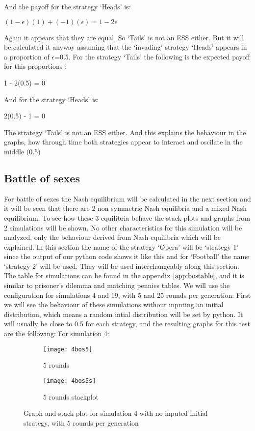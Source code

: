 And the payoff for the strategy `Heads' is:
\begin{center}
$(1-{\epsilon})(1) + (-1)({\epsilon}) =  1 - 2{\epsilon}$
\end{center}
Again it appears that they are equal. So `Tails' is not an ESS either. But it will be calculated it anyway assuming that the `invading' strategy `Heads' appears in a proportion of $\epsilon$=0.5. For the strategy `Tails' the following is the expected payoff for this proportions :
\begin{center}
1 -  2(0.5) = 0
\end{center}
And for the strategy `Heads' is:
\begin{center}
 2(0.5) - 1 = 0
\end{center}
The strategy `Tails' is not an ESS either. And this explains the behaviour in the graphs, how through time both strategies appear to interact and oscilate in the middle (0.5)



\subsection{Battle of sexes}
For battle of sexes the Nash equilibrium will be calculated in the next section and it will be seen that there are 2 non symmetric Nash equilibria and a mixed Nash equilibrium. To see how these 3 equilibria behave the stack plots and graphs from 2 simulations will be shown. No other characteristics for this simulation will be analyzed, only the behaviour derived from Nash equilibria which will be explained. In this section the name of the strategy `Opera' will be `strategy 1' since the output of our python code shows it like this and for `Football' the name `strategy 2' will be used. They will be used interchangeably along this section. The table for simulations can be found in the appendix $\ref{app:bostable}$, and it is similar to prisoner's dilemma and matching pennies tables.
We will use the configuration for simulations 4 and 19, with 5 and 25 rounds per generation. First we will see the behaviour of these simulations without inputing an initial distribution, which means a random intial distribution will be set by python. It will usually be close to 0.5 for each strategy, and the resulting graphs for this test are the following:
For simulation 4:

\begin{figure}[H]       
    \centering
    \begin{subfigure}[b]{0.4\textwidth}
	\centering
	{\texttt{[image: 4bos5]}}   
    	\caption{5 rounds}
	\label{fig:bossim4r5}
    \end{subfigure}
    \hfill
    \begin{subfigure}[b]{0.4\textwidth}
	\centering
	{\texttt{[image: 4bos5s]}}   
    	\caption{5 rounds stackplot}
	\label{fig:bossim4rs5}
    \end{subfigure}
    \caption{Graph and stack plot for simulation 4 with no inputed initial strategy, with 5 rounds per generation}
    \label{bossim4simulationgsp5}
\end{figure}


